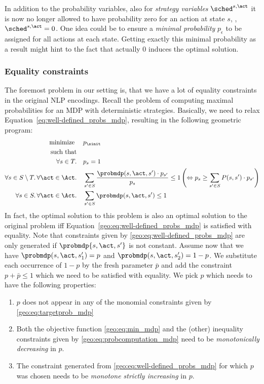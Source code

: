 In addition to the probability variables, also for \emph{strategy variables} $\sched^{s,\act}$ it is now no longer allowed to have probability zero for an action at state $s$, \ie, $\sched^{s,\act}=0$. One idea could be to ensure a \emph{minimal probability} $p_\epsilon$ to be assigned for all actions at each state. Getting exactly this minimal probability as a result might hint to the fact that actually $0$ induces the optimal solution.

\subsubsection{Equality constraints}
The foremost problem in our setting is, that we have a lot of equality constraints in the original NLP encodings. Recall the problem of computing maximal probabilities for an MDP with deterministic strategies. Basically, we need to relax Equation~\eqref{eq:well-defined_probs_mdp}, resulting in the following geometric program:
\begin{align}
			\text{minimize } &\quad p_{\sinit}\label{geo:eq:min_mdp}\\
			\text{such that}\\
			\forall s\in T.	 &\quad p_s=1\label{geo:eq:targetprob_mdp}\\
			\forall s\in S\setminus T.\,\forall \act\in\Act.	&\quad \sum_{s'\in S}\frac{\probmdp(s,\act,s')\cdot p_{s'}}{p_s}\leq 1 \left(\Leftrightarrow p_s \geq \sum_{s'\in S} P(s,s')\cdot p_{s'}\right)\label{geo:eq:probcomputation_mdp}\\
			\forall s\in S.\, \forall\act\in\Act.	 &\quad \sum_{s'\in S}\probmdp(s,\act,s')\leq 1\label{geo:eq:well-defined_probs_mdp}
		\end{align}
In fact, the optimal solution to this problem is also an optimal solution to the original problem iff 
Equation~\ref{geo:eq:well-defined_probs_mdp} is satisfied with equality.
Note that constraints given by \eqref{geo:eq:well-defined_probs_mdp} are only generated if $\probmdp{s,\act,s'}$ is not constant. Assume now that we have $\probmdp(s,\act,s'_1)=p$ and $\probmdp(s,\act,s'_2)=1-p$. We substitute each occurrence of $1-p$ by the fresh parameter $\bar p$ and add the constraint $p + \bar p \leq 1$ which we need to be satisfied with equality. We pick $p$ which needs to have the following properties: 
\begin{enumerate}
	\item $p$ does not appear in any of the monomial constraints given by \eqref{geo:eq:targetprob_mdp}
	\item Both the objective function \eqref{geo:eq:min_mdp} and the (other) inequality constraints given by \eqref{geo:eq:probcomputation_mdp} need to be \emph{monotonically decreasing} in $p$. 
	\item The constraint generated from \eqref{geo:eq:well-defined_probs_mdp} for which $p$ was chosen needs to be \emph{monotone strictly increasing} in $p$. 
\end{enumerate}
